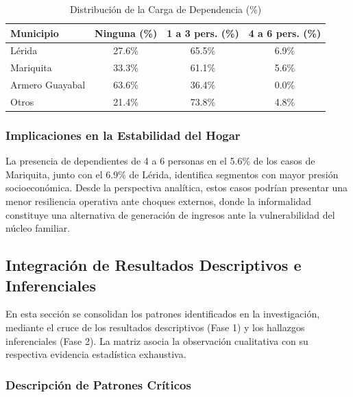 \documentclass[11pt,a4paper]{article}
\begin{document}
\begin{table}[H]
\centering
\caption{Distribución de la Carga de Dependencia (\%)}
\begin{tabular}{@{}lccc@{}}
\toprule
Municipio        & Ninguna (\%)  & 1 a 3 pers. (\%) & 4 a 6 pers. (\%) \\ \midrule
Lérida              & 27.6\%        & 65.5\%         & 6.9\% \\
Mariquita           & 33.3\%        & 61.1\%         & 5.6\% \\
Armero Guayabal     & 63.6\%        & 36.4\%         & 0.0\% \\
Otros               & 21.4\%        & 73.8\%         & 4.8\% \\ \bottomrule
\end{tabular}
\end{table}

\subsubsection{Implicaciones en la Estabilidad del Hogar}
La presencia de dependientes de 4 a 6 personas en el 5.6\% de los casos de Mariquita, junto con el 6.9\% de Lérida, identifica segmentos con mayor presión socioeconómica. Desde la perspectiva analítica, estos casos podrían presentar una menor resiliencia operativa ante choques externos, donde la informalidad constituye una alternativa de generación de ingresos ante la vulnerabilidad del núcleo familiar.

\subsection{Integraci\'on de Resultados Descriptivos e Inferenciales}

En esta sección se consolidan los patrones identificados en la investigación, mediante el cruce de los resultados descriptivos (Fase 1) y los hallazgos inferenciales (Fase 2). La matriz asocia la observación cualitativa con su respectiva evidencia estadística exhaustiva.

\subsubsection{Descripci\'on de Patrones Cr\'iticos}
\end{document}
